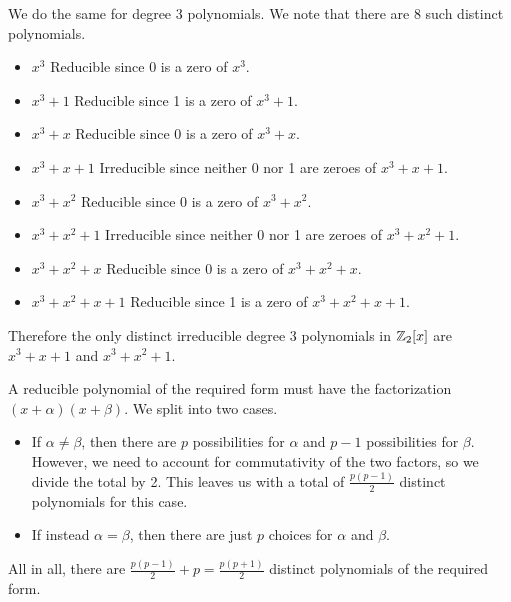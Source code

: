 \begin{questions}
\begin{partquestions}{\alph*}
        \item We do the same for degree 3 polynomials. We note that there are 8 such distinct polynomials.
        \begin{itemize}
            \item $\boxed{x^3}$ Reducible since 0 is a zero of $x^3$.
            \item $\boxed{x^3 + 1}$ Reducible since 1 is a zero of $x^3+1$.
            \item $\boxed{x^3 + x}$ Reducible since 0 is a zero of $x^3+x$.
            \item $\boxed{x^3 + x + 1}$ Irreducible since neither 0 nor 1 are zeroes of $x^3+x+1$.
            \item $\boxed{x^3 + x^2}$ Reducible since 0 is a zero of $x^3+x^2$.
            \item $\boxed{x^3 + x^2 + 1}$ Irreducible since neither 0 nor 1 are zeroes of $x^3+x^2+1$.
            \item $\boxed{x^3 + x^2 + x}$ Reducible since 0 is a zero of $x^3 + x^2 + x$.
            \item $\boxed{x^3 + x^2 + x + 1}$ Reducible since 1 is a zero of $x^3 + x^2 + x + 1$.
        \end{itemize}
        Therefore the only distinct irreducible degree 3 polynomials in $\mathbb{Z}_2[x]$ are $x^3+x+1$ and $x^3+x^2+1$.
    \end{partquestions}

    \item A reducible polynomial of the required form must have the factorization $(x+\alpha)(x+\beta)$. We split into two cases.
    \begin{itemize}
        \item If $\alpha \neq \beta$, then there are $p$ possibilities for $\alpha$ and $p - 1$ possibilities for $\beta$. However, we need to account for commutativity of the two factors, so we divide the total by 2. This leaves us with a total of $\frac{p(p-1)}{2}$ distinct polynomials for this case.
        \item If instead $\alpha = \beta$, then there are just $p$ choices for $\alpha$ and $\beta$.
    \end{itemize}
    All in all, there are $\frac{p(p-1)}{2} + p = \frac{p(p+1)}{2}$ distinct polynomials of the required form.


\end{questions}
